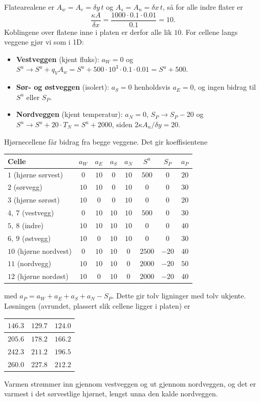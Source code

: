 Flatearealene er $A_w=A_e=\delta y\,t$ og $A_s=A_n=\delta x\,t$, så for alle indre flater er
\[
\frac{\kappa A}{\delta x} = \frac{1000\cdot 0.1\cdot 0.01}{0.1} = 10 .
\]
Koblingene over flatene inne i platen er derfor alle lik $10$. For cellene langs veggene gjør vi som i 1D:
\begin{itemize}
\item \textbf{Vestveggen} (kjent fluks): $a_W=0$ og $S^u \to S^u + q_V A_w = S^u + 500\cdot 10^3\cdot 0.1\cdot 0.01 = S^u + 500$.
\item \textbf{Sør- og østveggen} (isolert): $a_S=0$ henholdsvis $a_E=0$, og ingen bidrag til $S^u$ eller $S_P$.
\item \textbf{Nordveggen} (kjent temperatur): $a_N=0$, $S_P \to S_P - 20$ og $S^u \to S^u + 20\cdot T_N = S^u + 2000$, siden $2\kappa A_n/\delta y = 20$.
\end{itemize}
Hjørnecellene får bidrag fra begge veggene. Det gir koeffisientene
\begin{center}
\begin{tabular}{|l|c|c|c|c|c|c|c|}
\hline
Celle & $a_W$ & $a_E$ & $a_S$ & $a_N$ & $S^u$ & $S_P$ & $a_P$ \\
\hline
$1$ (hjørne sørvest) & $0$ & $10$ & $0$ & $10$ & $500$ & $0$ & $20$ \\
$2$ (sørvegg) & $10$ & $10$ & $0$ & $10$ & $0$ & $0$ & $30$ \\
$3$ (hjørne sørøst) & $10$ & $0$ & $0$ & $10$ & $0$ & $0$ & $20$ \\
$4,\ 7$ (vestvegg) & $0$ & $10$ & $10$ & $10$ & $500$ & $0$ & $30$ \\
$5,\ 8$ (indre) & $10$ & $10$ & $10$ & $10$ & $0$ & $0$ & $40$ \\
$6,\ 9$ (østvegg) & $10$ & $0$ & $10$ & $10$ & $0$ & $0$ & $30$ \\
$10$ (hjørne nordvest) & $0$ & $10$ & $10$ & $0$ & $2500$ & $-20$ & $40$ \\
$11$ (nordvegg) & $10$ & $10$ & $10$ & $0$ & $2000$ & $-20$ & $50$ \\
$12$ (hjørne nordøst) & $10$ & $0$ & $10$ & $0$ & $2000$ & $-20$ & $40$ \\
\hline
\end{tabular}
\end{center}
med $a_P = a_W+a_E+a_S+a_N-S_P$. Dette gir tolv ligninger med tolv ukjente. Løsningen (avrundet, plassert slik cellene ligger i platen) er
\begin{center}
\begin{tabular}{|c|c|c|}
\hline
$146.3$ & $129.7$ & $124.0$ \\
\hline
$205.6$ & $178.2$ & $166.2$ \\
\hline
$242.3$ & $211.2$ & $196.5$ \\
\hline
$260.0$ & $227.8$ & $212.2$ \\
\hline
\end{tabular}
\end{center}
Varmen strømmer inn gjennom vestveggen og ut gjennom nordveggen, og det er varmest i det sørvestlige hjørnet, lengst unna den kalde nordveggen.

